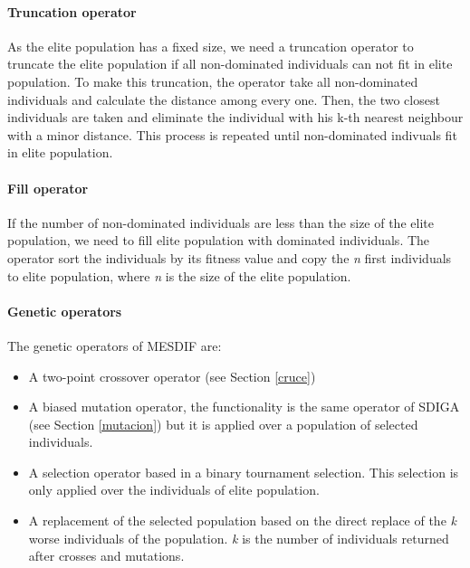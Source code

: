 \documentclass[]{article}
\begin{document}
\paragraph{Truncation operator}\label{truncation-operator}

As the elite population has a fixed size, we need a truncation operator
to truncate the elite population if all non-dominated individuals can
not fit in elite population. To make this truncation, the operator take
all non-dominated individuals and calculate the distance among every
one. Then, the two closest individuals are taken and eliminate the
individual with his k-th nearest neighbour with a minor distance. This
process is repeated until non-dominated indivuals fit in elite
population.

\paragraph{Fill operator}\label{fill-operator}

If the number of non-dominated individuals are less than the size of the
elite population, we need to fill elite population with dominated
individuals. The operator sort the individuals by its fitness value and
copy the \emph{n} first individuals to elite population, where \emph{n}
is the size of the elite population.

\paragraph{Genetic operators}\label{genetic-operators}

The genetic operators of MESDIF are:

\begin{itemize}
  \item A two-point crossover operator (see Section \ref{cruce})
  \item A biased mutation operator, the functionality is the same operator of SDIGA (see Section \ref{mutacion}) but it is applied over a population of selected individuals.
  \item A selection operator based in a binary tournament selection. This selection is only applied over the individuals of elite population.
  \item A replacement of the selected population based on the direct replace of the \textit{k} worse individuals of the population. \textit{k} is the number of individuals returned after crosses and mutations.
\end{itemize}
\end{document}
